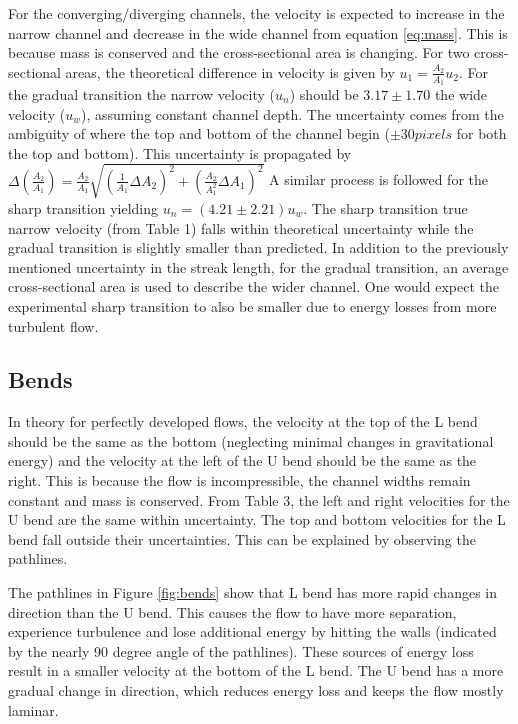 \documentclass[12pt]{article}
\begin{document}
For the converging/diverging channels, the velocity is expected to increase in the narrow channel and decrease in the wide channel from equation \ref{eq:mass}. This is because mass is conserved and the cross-sectional area is changing. 
For two cross-sectional areas, the theoretical difference in velocity is given by $u_1 = \frac{A_2}{A_1}u_2$. For the gradual transition the narrow velocity ($u_n$) should be $3.17 \pm 1.70$ the wide velocity ($u_w$), assuming constant channel depth. The uncertainty comes from the ambiguity of where the top and bottom of the channel begin ($\pm 30 pixels$ for both the top and bottom). This uncertainty is propagated by $\Delta (\frac{A_2}{A_1}) = \frac{A_2}{A_1} \sqrt{(\frac{1}{A_1} \Delta {A_2})^2 + (\frac{A_2}{A_1^2} \Delta {A_1})^2}$
A similar process is followed for the sharp transition yielding $u_n = (4.21 \pm 2.21) u_w$. The sharp transition true narrow velocity (from Table 1) falls within theoretical uncertainty while the gradual transition is slightly smaller than predicted.
In addition to the previously mentioned uncertainty in the streak length, for the gradual transition, an average cross-sectional area is used to describe the wider channel. One would expect the experimental sharp transition to also be smaller due to energy losses from more turbulent flow.

\subsection*{Bends}
In theory for perfectly developed flows, the velocity at the top of the L bend should be the same as the bottom (neglecting minimal changes in gravitational energy) and the velocity at the left of the U bend should be the same as the right. This is because the flow is incompressible, the channel widths remain constant and mass is conserved.
From Table 3, the left and right velocities for the U bend are the same within uncertainty. The top and bottom velocities for the L bend fall outside their uncertainties. This can be explained by observing the pathlines.

The pathlines in Figure \ref{fig:bends} show that L bend has more rapid changes in direction than the U bend. This causes the flow to have more separation, experience turbulence and lose additional energy by hitting the walls (indicated by the nearly 90 degree angle of the pathlines). These sources of energy loss result in a smaller velocity at the bottom of the L bend. The U bend has a more gradual change in direction, which reduces energy loss and keeps the flow mostly laminar.
\end{document}
